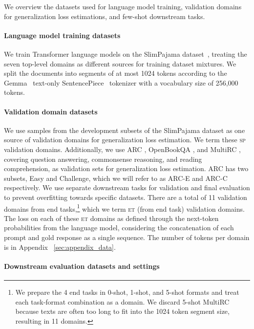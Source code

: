 
We overview the datasets used for language model training, validation domains for generalization loss estimations, and few-shot downstream tasks. 


\paragraph{Language model training datasets}

We train Transformer language models on the SlimPajama dataset~\cite{cerebras2023slimpajama}, treating the seven top-level domains as different sources for training dataset mixtures. We split the documents into segments of at most 1024 tokens according to the Gemma~\cite{gemma2} text-only SentencePiece~\cite{kudo-richardson-2018-sentencepiece} tokenizer with a vocabulary size of 256,000 tokens. 


\paragraph{Validation domain datasets}

We use samples from the development subsets of the SlimPajama dataset as one source of validation domains for generalization loss estimation. We term these \textsc{sp}  validation domains.
Additionally, we use ARC \cite{arc}, OpenBookQA \cite{openbookqa}, and MultiRC \cite{multirc}, covering question answering, commonsense reasoning, and reading comprehension, as validation sets for generalization loss estimation.
ARC has two subsets, Easy and Challenge, which we will refer to as ARC-E and ARC-C respectively.
We use separate downstream tasks for validation and final evaluation to prevent overfitting towards specific datasets. There are a total of 11 validation domains from end tasks,\footnote{We prepare the 4 end tasks in 0-shot, 1-shot, and 5-shot formats and treat each task-format combination as a domain. We discard 5-shot MultiRC because texts are often too long to fit into the 1024 token segment size, resulting in 11 domains.} which we term \textsc{et} (from end task) validation domains. The loss on each of these \textsc{et} domains as defined through the next-token probabilities from the language model, considering  the concatenation of each prompt and gold response as a single sequence. The number of tokens per domain is in Appendix ~\ref{sec:appendix_data}.


\paragraph{Downstream evaluation datasets and settings}

